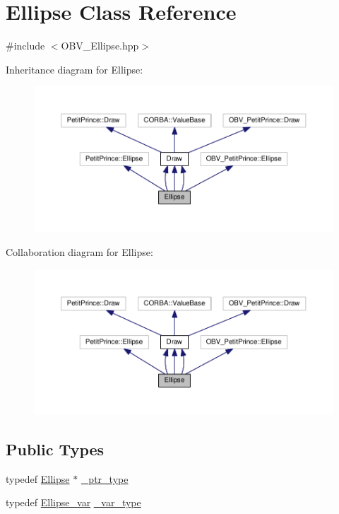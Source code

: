 \hypertarget{class_ellipse}{}\section{Ellipse Class Reference}
\label{class_ellipse}


{\ttfamily \#include $<$O\+B\+V\+\_\+\+Ellipse.\+hpp$>$}



Inheritance diagram for Ellipse\+:
\nopagebreak
\begin{figure}[H]
\begin{center}
\leavevmode
\includegraphics[width=350pt]{class_ellipse__inherit__graph}
\end{center}
\end{figure}


Collaboration diagram for Ellipse\+:
\nopagebreak
\begin{figure}[H]
\begin{center}
\leavevmode
\includegraphics[width=350pt]{class_ellipse__coll__graph}
\end{center}
\end{figure}
\subsection*{Public Types}
\begin{DoxyCompactItemize}
\item 
typedef \hyperlink{class_ellipse}{Ellipse} $\ast$ \hyperlink{class_ellipse_ac03e9a197e4d346d6a7f4360f83affdc}{\+\_\+ptr\+\_\+type}
\item 
typedef \hyperlink{_petit_prince_8hpp_a2e82f3c0eab1432cbb901c90c56b845d}{Ellipse\+\_\+var} \hyperlink{class_ellipse_af5ce6e507c505dcd1b6ef888b904616f}{\+\_\+var\+\_\+type}
\end{DoxyCompactItemize}
